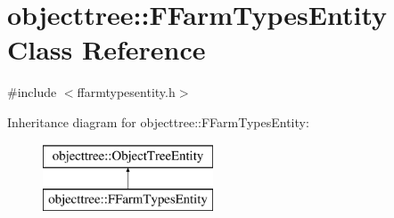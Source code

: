 \hypertarget{classobjecttree_1_1_f_farm_types_entity}{}\section{objecttree\+::F\+Farm\+Types\+Entity Class Reference}
\label{classobjecttree_1_1_f_farm_types_entity}


{\ttfamily \#include $<$ffarmtypesentity.\+h$>$}

Inheritance diagram for objecttree\+::F\+Farm\+Types\+Entity\+:\begin{figure}[H]
\begin{center}
\leavevmode
\includegraphics[height=2.000000cm]{dd/d92/classobjecttree_1_1_f_farm_types_entity}
\end{center}
\end{figure}
